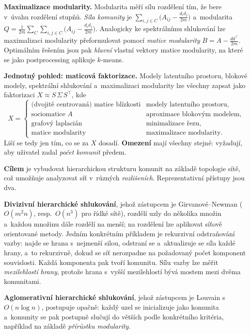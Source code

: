\documentclass[11pt,a4paper]{article}
\theoremstyle{definition}
\begin{document}
\begin{defbox}
\textbf{Maximalizace modularity.} Modularita měří sílu rozdělení tím, že bere v~úvahu rozdělení
stupňů. \emph{Síla komunity} je $\sum_{i,j\in C}\big(A_{ij}-\frac{d_id_j}{2m}\big)$
a~modularita $Q=\frac{1}{2m}\sum_{C}\sum_{i,j\in C}\big(A_{ij}-\frac{d_id_j}{2m}\big)$.
Analogicky ke spektrálnímu shlukování lze maximalizaci modularity přeformulovat pomocí
\emph{matice modularity} $B=A-\frac{dd^{\!\top}}{2m}$. Optimálním řešením jsou pak \emph{hlavní}
vlastní vektory matice modularity, na které se jako postprocessing aplikuje $k$-means.

\textbf{Jednotný pohled: maticová faktorizace.} Modely latentního prostoru, blokové modely,
spektrální shlukování a~maximalizaci modularity lze všechny zapsat jako faktorizaci
$X\approx S\,\Sigma\,S^{\!\top}$, kde
\[ X=\begin{cases}
\text{(dvojitě centrovaná) matice blízkosti} & \text{modely latentního prostoru},\\
\text{sociomatice }A & \text{aproximace blokovým modelem},\\
\text{grafový laplacián} & \text{minimalizace řezu},\\
\text{matice modularity} & \text{maximalizace modularity}.
\end{cases} \]
Liší se tedy jen tím, co se za $X$ dosadí. \textbf{Omezení} mají všechny stejné: vyžadují, aby
uživatel zadal \emph{počet komunit} předem.
\end{defbox}

\begin{defbox}
\textbf{Cílem} je vybudovat hierarchickou strukturu komunit na základě topologie sítě, což
umožňuje analyzovat síť v~různých \emph{rozlišeních}. Reprezentativní přístupy jsou dva.

\textbf{Divizivní hierarchické shlukování}, jehož zástupcem je Girvanové--Newman ($O(m^2n)$,
resp.\ $O(n^3)$ pro řídké sítě), rozdělí uzly do několika množin a~každou množinu dále rozdělí
na menší; na rozdělení lze aplikovat síťově orientované metody. Jedním konkrétním příkladem je
rekurzivní odstraňování  vazby: najde se hrana s~nejmenší silou, odstraní se
a~aktualizuje se síla každé hrany, a~to rekurzivně, dokud se síť nerozpadne na požadovaný počet
komponent souvislosti. Každá komponenta pak tvoří komunitu. Sílu vazby lze měřit
\emph{mezilehlostí hrany}, protože hrana s~vyšší mezilehlostí bývá mostem mezi dvěma komunitami.

\textbf{Aglomerativní hierarchické shlukování}, jehož zástupcem je Louvain s~$O(n\log n)$,
postupuje opačně: každý uzel se inicializuje jako komunita a~komunity se pak postupně slučují do
větších podle konkrétního kritéria, například na základě \emph{přírůstku modularity}.
\end{defbox}
\end{document}
